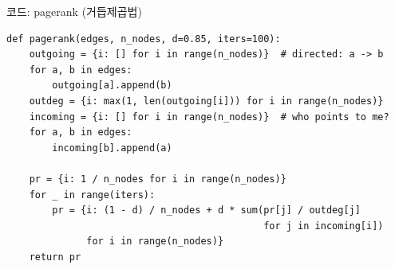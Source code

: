 \begin{frame}[fragile]{코드: pagerank (거듭제곱법)}
\begin{lstlisting}
def pagerank(edges, n_nodes, d=0.85, iters=100):
    outgoing = {i: [] for i in range(n_nodes)}  # directed: a -> b
    for a, b in edges:
        outgoing[a].append(b)
    outdeg = {i: max(1, len(outgoing[i])) for i in range(n_nodes)}
    incoming = {i: [] for i in range(n_nodes)}  # who points to me?
    for a, b in edges:
        incoming[b].append(a)

    pr = {i: 1 / n_nodes for i in range(n_nodes)}
    for _ in range(iters):
        pr = {i: (1 - d) / n_nodes + d * sum(pr[j] / outdeg[j]
                                             for j in incoming[i])
              for i in range(n_nodes)}
    return pr
\end{lstlisting}
\end{frame}
